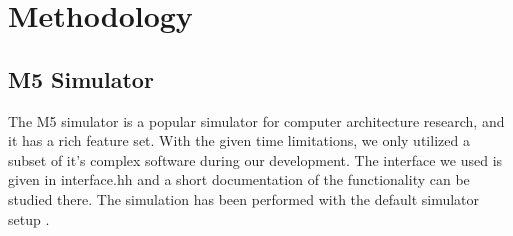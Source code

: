 \section{Methodology}

\subsection{M5 Simulator}

The M5 simulator is a popular simulator for computer architecture research, and
it has a rich feature set. With the given time limitations, we only utilized a
subset of it’s complex software during our development. The interface we used is
given in interface.hh and a short documentation of the functionality can be
studied there. The simulation has been performed with the default simulator
setup .


